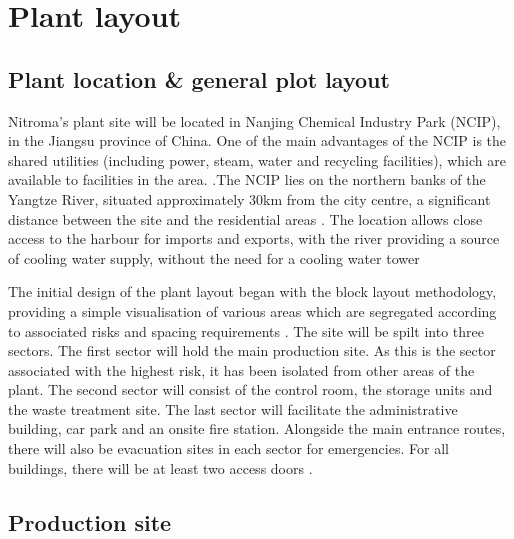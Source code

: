 \section{Plant layout}

\subsection{Plant location \& general plot layout}

Nitroma’s plant site will be located in Nanjing Chemical Industry Park (NCIP), in the Jiangsu province of China. One of the main advantages of the NCIP is the shared utilities (including power, steam, water and recycling facilities), which are available to facilities in the area. \cite{independent_commodity_intelligence_services_china_2007}.The NCIP lies on the northern banks of the Yangtze River, situated approximately 30km from the city centre, a significant distance between the site and the residential areas \cite{zeng_divergent_2011}. The location allows close access to the harbour for imports and exports, with the river providing a source of cooling water supply, without the need for a cooling water tower


The initial design of the plant layout began with the block layout methodology, providing a simple visualisation of various areas which are segregated according to associated risks and spacing requirements \cite{center_for_chemical_process_safety_site_2010}. The site will be spilt into three sectors. The first sector will hold the main production site. As this is the sector associated with the highest risk, it has been isolated from other areas of the plant. The second sector will consist of the control room, the storage units and the waste treatment site. The last sector will facilitate the administrative building, car park and an onsite fire station. Alongside the main entrance routes, there will also be evacuation sites in each sector for emergencies. For all buildings, there will be at least two access doors \cite{aiche_dows_1994}.






\subsection{Production site}


